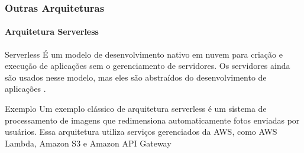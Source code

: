 \documentclass[
	10pt, %
	t, %
]{beamer}
\begin{document}



	

\begin{frame}
	\frametitle{Outras Arquiteturas}
	\framesubtitle{Arquitetura Serverless}

	\begin{block}{Serverless}
		É um modelo de desenvolvimento nativo em nuvem para criação e execução de aplicações sem o gerenciamento de servidores. Os servidores ainda são usados nesse modelo, mas eles são abstraídos do desenvolvimento de aplicações \parencite{REDHAT2024}.
	\end{block}

	\begin{exampleblock}{Exemplo}
		Um exemplo clássico de arquitetura serverless é um sistema de processamento de imagens que redimensiona automaticamente fotos enviadas por usuários. Essa arquitetura utiliza serviços gerenciados da AWS, como AWS Lambda, Amazon S3 e Amazon API Gateway
	\end{exampleblock}
	
\end{frame}



		
\end{document}
